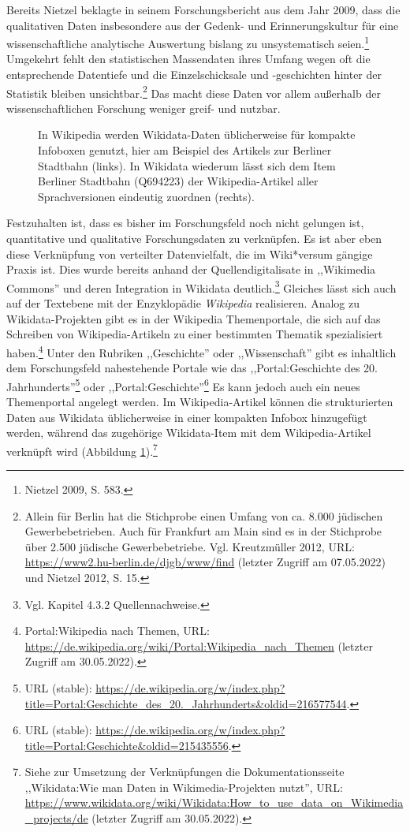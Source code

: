 Bereits Nietzel beklagte in seinem Forschungsbericht aus dem Jahr 2009, dass die qualitativen Daten insbesondere aus der Gedenk- und Erinnerungskultur für eine wissenschaftliche analytische Auswertung bislang zu unsystematisch seien.\footnote{Nietzel 2009, S. 583.} Umgekehrt fehlt den statistischen Massendaten ihres Umfang wegen oft die entsprechende Datentiefe und die Einzelschicksale und -geschichten hinter der Statistik bleiben unsichtbar.\footnote{Allein für Berlin hat die Stichprobe einen Umfang von ca. 8.000 jüdischen Gewerbebetrieben. Auch für Frankfurt am Main sind es in der Stichprobe über 2.500 jüdische Gewerbebetriebe. Vgl. Kreutzmüller 2012, URL: \url{https://www2.hu-berlin.de/djgb/www/find} (letzter Zugriff am 07.05.2022) und Nietzel 2012, S. 15.} Das macht diese Daten vor allem außerhalb der wissenschaftlichen Forschung weniger greif- und nutzbar. 

\begin{figure}[h]
    \centering
    \caption[Wikidata und Wikipedia]{In Wikipedia werden Wikidata-Daten üblicherweise für kompakte Infoboxen genutzt, hier am Beispiel des Artikels zur Berliner Stadtbahn (links). In Wikidata wiederum lässt sich dem Item Berliner Stadtbahn (Q694223) der Wikipedia-Artikel aller Sprachversionen eindeutig zuordnen (rechts).}
    \label{fig:wikidatawikipedia}
\end{figure}

Festzuhalten ist, dass es bisher im Forschungsfeld noch nicht gelungen ist, quantitative und qualitative Forschungsdaten zu verknüpfen. Es ist aber eben diese Verknüpfung von verteilter Datenvielfalt, die im Wiki*versum gängige Praxis ist. Dies wurde bereits anhand der Quellendigitalisate in ,,Wikimedia Commons'' und deren Integration in Wikidata deutlich.\footnote{Vgl. Kapitel 4.3.2 Quellennachweise.} Gleiches lässt sich auch auf der Textebene mit der Enzyklopädie \textit{Wikipedia} realisieren. Analog zu Wikidata-Projekten gibt es in der Wikipedia Themenportale, die sich auf das Schreiben von Wikipedia-Artikeln zu einer bestimmten Thematik spezialisiert haben.\footnote{Portal:Wikipedia nach Themen, URL: \url{https://de.wikipedia.org/wiki/Portal:Wikipedia_nach_Themen} (letzter Zugriff am 30.05.2022).} Unter den Rubriken ,,Geschichte'' oder ,,Wissenschaft'' gibt es inhaltlich dem Forschungsfeld nahestehende Portale wie das ,,Portal:Geschichte des 20. Jahrhunderts''\footnote{URL (stable): \url{https://de.wikipedia.org/w/index.php?title=Portal:Geschichte\_des\_20.\_Jahrhunderts\&oldid=216577544}.} oder ,,Portal:Geschichte''\footnote{URL (stable): \url{https://de.wikipedia.org/w/index.php?title=Portal:Geschichte\&oldid=215435556}.} Es kann jedoch auch ein neues Themenportal angelegt werden. Im Wikipedia-Artikel können die strukturierten Daten aus Wikidata üblicherweise in einer kompakten Infobox hinzugefügt werden, während das zugehörige Wikidata-Item mit dem Wikipedia-Artikel verknüpft wird (Abbildung \ref{fig:wikidatawikipedia}).\footnote{Siehe zur Umsetzung der Verknüpfungen die Dokumentationsseite ,,Wikidata:Wie man Daten in Wikimedia-Projekten nutzt'', URL: \url{https://www.wikidata.org/wiki/Wikidata:How_to_use_data_on_Wikimedia_projects/de} (letzter Zugriff am 30.05.2022).}

